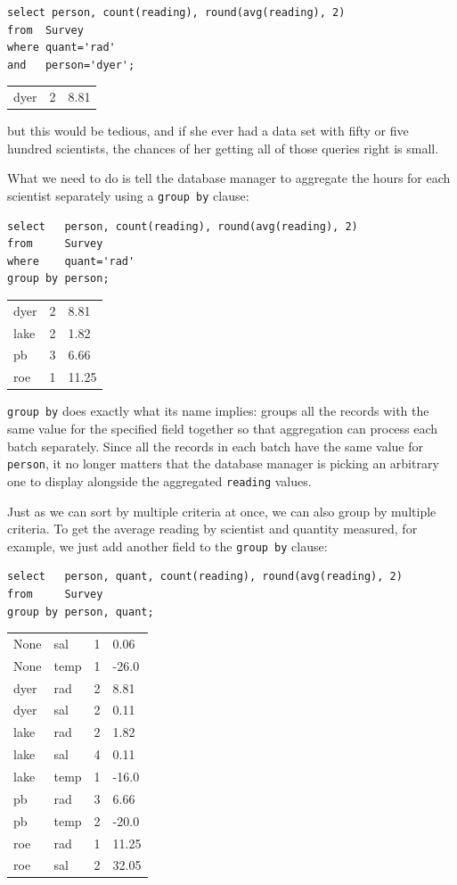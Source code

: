 \documentclass{book}
\begin{document}
\begin{verbatim}
select person, count(reading), round(avg(reading), 2)
from  Survey
where quant='rad'
and   person='dyer';
\end{verbatim}

\begin{tabular}{lll}
dyer & 2 & 8.81 \\
\end{tabular}

but this would be tedious, and if she ever had a data set with fifty or
five hundred scientists, the chances of her getting all of those queries
right is small.

What we need to do is tell the database manager to aggregate the hours
for each scientist separately using a \texttt{group by} clause:

\begin{verbatim}
select   person, count(reading), round(avg(reading), 2)
from     Survey
where    quant='rad'
group by person;
\end{verbatim}

\begin{tabular}{lll}
dyer & 2 & 8.81 \\
lake & 2 & 1.82 \\
pb & 3 & 6.66 \\
roe & 1 & 11.25 \\
\end{tabular}

\texttt{group by} does exactly what its name implies: groups all the
records with the same value for the specified field together so that
aggregation can process each batch separately. Since all the records in
each batch have the same value for \texttt{person}, it no longer matters
that the database manager is picking an arbitrary one to display
alongside the aggregated \texttt{reading} values.

Just as we can sort by multiple criteria at once, we can also group by
multiple criteria. To get the average reading by scientist and quantity
measured, for example, we just add another field to the
\texttt{group by} clause:

\begin{verbatim}
select   person, quant, count(reading), round(avg(reading), 2)
from     Survey
group by person, quant;
\end{verbatim}

\begin{tabular}{llll}
None & sal & 1 & 0.06 \\
None & temp & 1 & -26.0 \\
dyer & rad & 2 & 8.81 \\
dyer & sal & 2 & 0.11 \\
lake & rad & 2 & 1.82 \\
lake & sal & 4 & 0.11 \\
lake & temp & 1 & -16.0 \\
pb & rad & 3 & 6.66 \\
pb & temp & 2 & -20.0 \\
roe & rad & 1 & 11.25 \\
roe & sal & 2 & 32.05 \\
\end{tabular}
\end{document}
